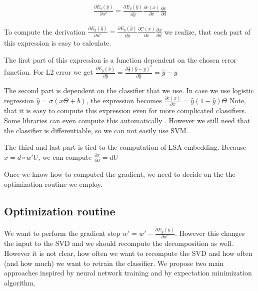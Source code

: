     \begin{align}
    \frac{\partial E_y(\hat{y})}{\partial w'} = \frac{\partial E_y(\hat{y})}{\partial \hat{y}} \frac{\partial c(x)}{\partial x} \frac{\partial x}{\partial d}
    \end{align}
    
    To compute the derivation $\frac{\partial E_y(\hat{y})}{\partial w'} = \frac{\partial E_y(\hat{y})}{\partial \hat{y}} \frac{\partial C(x)}{\partial x} \frac{\partial x}{\partial d}$ we realize,
    that each part of this expression is easy to calculate.
    
    The first part of this expression is a function dependent on the chosen error function. 
    For L2 error we get 
    $\frac{\partial E_y(\hat{y})}{\partial \hat{y}} = \frac{\partial \frac{1}{2}(\hat{y}-y)^2}{\partial \hat{y}} = \hat{y}-y$
    
    The second part is dependent on the classifier that we use. 
    In case we use logistic regression $\hat{y} = \sigma(x \Theta + b)$, the expression becomes
    $\frac{\partial c(x)}{\partial x} = \hat{y} (1-\hat{y}) \Theta$
    Note, that it is easy to compute this expression even for more complicated classifiers. 
    Some libraries can even compute this automatically \cite{tensorflow2015-whitepaper}.
    However we still need that the classifier is differentiable, so we can not easily use SVM. 
    
    The third and last part is tied to the computation of LSA embedding.
    Because $x = d \circ w' U$, we can compute 
    $\frac{\partial x}{\partial d} = d U$ \* %
    
    Once we know how to computed the gradient, we need to decide on the the optimization routine we employ.
    
    \subsection{Optimization routine}
    
    We want to perform the gradient step $w' = w' - \frac{\partial E_y(\hat{y})}{\partial w'}$. 
    However this changes the input to the SVD and we should recompute the decomposition as well. 
    However it is not clear, how often we want to recompute the SVD and how often (and how much) we want to retrain the classifier.
    We propose two main approaches inspired by neural network training and by 
    expectation minimization algorithm. \* %
    
